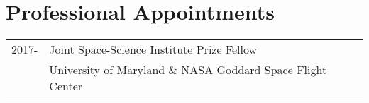 \documentclass[letterpaper]{article}
\renewenvironment{itemize}{
  \begin{list}{}{
    \setlength{\leftmargin}{1.5em}
  }
}{
  \end{list}
}
\begin{document}
\section*{Professional Appointments} %
\begin{itemize}
\item \begin{tabular}{ll}
2017- & Joint Space-Science Institute Prize Fellow \\
	 & University of Maryland  \& NASA Goddard Space Flight Center\\
\end{tabular}
\end{itemize}



\end{document}
